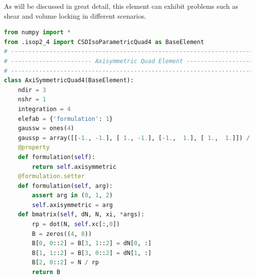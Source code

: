 \documentclass[10pt,letterpaper]{report}
\numberwithin{equation}{chapter}
\begin{document}
As will be discussed in great detail, this element can exhibit problems such as shear and volume locking in different scenarios.
\begin{lstlisting}[language=python]
from numpy import *
from .isop2_4 import CSDIsoParametricQuad4 as BaseElement
# --------------------------------------------------------------------------- #
# ----------------------- Axisymmetric Quad Element ------------------------- #
# --------------------------------------------------------------------------- #
class AxiSymmetricQuad4(BaseElement):
    ndir = 3
    nshr = 1
    integration = 4
    elefab = {'formulation': 1}
    gaussw = ones(4)
    gaussp = array([[-1., -1.], [ 1., -1.], [-1.,  1.], [ 1.,  1.]]) / sqrt(3.)
    @property
    def formulation(self):
        return self.axisymmetric
    @formulation.setter
    def formulation(self, arg):
        assert arg in (0, 1, 2)
        self.axisymmetric = arg
    def bmatrix(self, dN, N, xi, *args):
        rp = dot(N, self.xc[:,0])
        B = zeros((4, 8))
        B[0, 0::2] = B[3, 1::2] = dN[0, :]
        B[1, 1::2] = B[3, 0::2] = dN[1, :]
        B[2, 0::2] = N / rp
        return B

\end{lstlisting}

%
%
%
%
%
\end{document}
